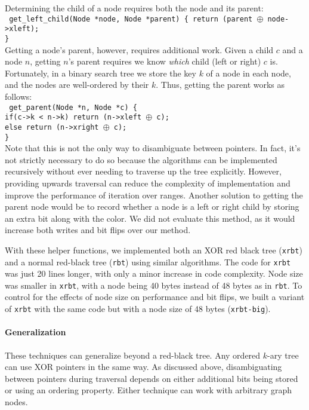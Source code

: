 Determining the child of a node requires both the node and its parent:\\
\texttt{
	get\_left\_child(Node *node, Node *parent) \{
	\indent return (parent $\oplus$ node->xleft); \\
	\}
}\\
Getting a node's parent, however, requires additional work. Given a child $c$ and a
node $n$, getting $n$'s parent requires we know \textit{which} child (left or
right) $c$ is. Fortunately, in a binary search tree we store the key $k$ of a node
in each node, and the nodes are well-ordered by their $k$. Thus, getting the
parent works as follows:\\
\texttt{
	get\_parent(Node *n, Node *c) \{\\
	\indent if(c->k < n->k) return (n->xleft $\oplus$ c);\\
	\indent else return (n->xright $\oplus$ c);\\
	\}}\\
Note that this is not the only way to disambiguate between pointers. In fact,
it's not strictly necessary to do so because the algorithms can be implemented
recursively without ever needing to traverse up the tree explicitly. However, providing upwards
traversal can reduce the complexity of implementation and improve the performance of iteration over
ranges. Another
solution to getting the parent node would be to record whether a node is a left
or right child by storing an extra bit along with the color. We did not
evaluate this method, as it would increase both writes and bit flips over our method.

\newcommand{\xrbt}{\texttt{xrbt}\xspace}
\newcommand{\xrbtbig}{\texttt{xrbt-big}\xspace}
\newcommand{\rbt}{\texttt{rbt}\xspace}

With these helper functions, we implemented both an XOR red black
tree (\xrbt) and a normal red-black tree (\rbt) using similar algorithms.
The code for \xrbt was just 20 lines longer, with only a
minor increase in code complexity. Node size was smaller in \xrbt,
with a node being 40 bytes instead of 48 bytes as in \rbt. To control for
the effects of node size on performance and bit flips, we built a variant of
\xrbt with the same code but with a node size of 48 bytes (\xrbtbig).


\paragraph{Generalization} These techniques can generalize beyond a red-black tree. Any ordered
$k$-ary tree can use XOR pointers in the same way. As discussed above, disambiguating between pointers
during traversal depends on either additional bits being stored or using an ordering property.
Either technique can work with arbitrary graph nodes.

